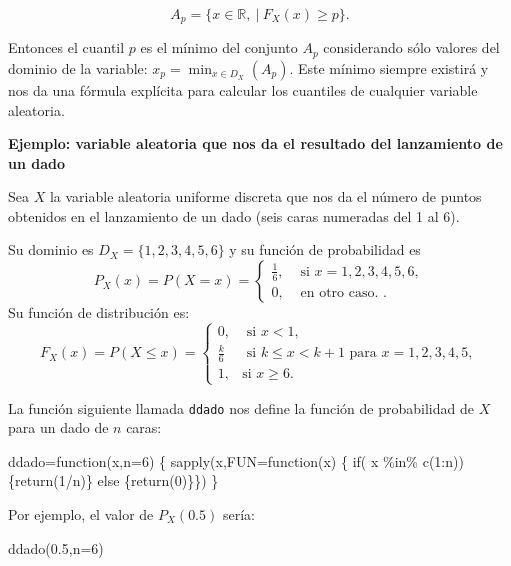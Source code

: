 \documentclass[
  letterpaper,
  DIV=11,
  numbers=noendperiod]{scrreprt}
\newenvironment{Shaded}{\begin{snugshade}}{\end{snugshade}}
\newcommand{\AttributeTok}[1]{\textcolor[rgb]{0.40,0.45,0.13}{#1}}
\newcommand{\ControlFlowTok}[1]{\textcolor[rgb]{0.00,0.23,0.31}{#1}}
\newcommand{\DecValTok}[1]{\textcolor[rgb]{0.68,0.00,0.00}{#1}}
\newcommand{\FloatTok}[1]{\textcolor[rgb]{0.68,0.00,0.00}{#1}}
\newcommand{\FunctionTok}[1]{\textcolor[rgb]{0.28,0.35,0.67}{#1}}
\newcommand{\NormalTok}[1]{\textcolor[rgb]{0.00,0.23,0.31}{#1}}
\newcommand{\OtherTok}[1]{\textcolor[rgb]{0.00,0.23,0.31}{#1}}
\newcommand{\SpecialCharTok}[1]{\textcolor[rgb]{0.37,0.37,0.37}{#1}}
\begin{document}
\[
A_p =\{x\in\mathbb{R},\ |\ F_X(x)\geq p\}.
\]

Entonces el cuantil \(p\) es el mínimo del conjunto \(A_p\) considerando
sólo valores del dominio de la variable:
\(x_p =\displaystyle\min_{x\in D_X}(A_p)\). Este mínimo siempre existirá
y nos da una fórmula explícita para calcular los cuantiles de cualquier
variable aleatoria.

\textbf{Ejemplo: variable aleatoria que nos da el resultado del
lanzamiento de un dado}

Sea \(X\) la variable aleatoria uniforme discreta que nos da el número
de puntos obtenidos en el lanzamiento de un dado (seis caras numeradas
del 1 al 6).

Su dominio es \(D_X=\{1,2,3,4,5,6\}\) y su función de probabilidad es \[
P_X(x)=P(X=x)=
\left\{
\begin{array}{ll}
 \frac{1}{6}, & \mbox{ si } x=1,2,3,4,5,6, \\
0, & \mbox{ en otro caso. }.
\end{array}
\right.
\] Su función de distribución es: \[
F_X(x)= P(X\leq x)=
\left\{
\begin{array}{ll}
0, & \mbox{ si } x<1, \\
\frac{k}{6} & \mbox{ si } k\leq x< k+1 \mbox{ para } x= 1,2,3,4,5, \\
 1, & \mbox{si  } x \geq 6.
\end{array}
\right.
\]

La función siguiente llamada \texttt{ddado} nos define la función de
probabilidad de \(X\) para un dado de \(n\) caras:

\begin{Shaded}
\begin{Highlighting}[]
\NormalTok{ddado}\OtherTok{=}\ControlFlowTok{function}\NormalTok{(x,}\AttributeTok{n=}\DecValTok{6}\NormalTok{) \{}
  \FunctionTok{sapply}\NormalTok{(x,}\AttributeTok{FUN=}\ControlFlowTok{function}\NormalTok{(x) \{}
    \ControlFlowTok{if}\NormalTok{( x }\SpecialCharTok{\%in\%} \FunctionTok{c}\NormalTok{(}\DecValTok{1}\SpecialCharTok{:}\NormalTok{n))\{}\FunctionTok{return}\NormalTok{(}\DecValTok{1}\SpecialCharTok{/}\NormalTok{n)\} }\ControlFlowTok{else}\NormalTok{ \{}\FunctionTok{return}\NormalTok{(}\DecValTok{0}\NormalTok{)\}\})}
\NormalTok{  \}}
\end{Highlighting}
\end{Shaded}

Por ejemplo, el valor de \(P_X(0.5)\) sería:

\begin{Shaded}
\begin{Highlighting}[]
\FunctionTok{ddado}\NormalTok{(}\FloatTok{0.5}\NormalTok{,}\AttributeTok{n=}\DecValTok{6}\NormalTok{)}
\end{Highlighting}
\end{Shaded}
\end{document}
